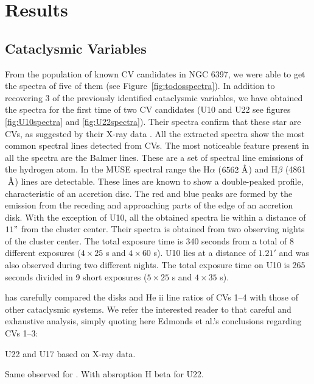 \chapter{Results}\label{chap:results}
\thispagestyle{fancy}

\section{Cataclysmic Variables }
From the population of known CV candidates in NGC 6397, we were able to get the spectra of five of them (see Figure~\ref{fig:todosspectra}). In addition to recovering 3 of the previously identified cataclysmic variables, we have obtained the spectra for the first time of two CV candidates (U10 and U22 see figures \ref{fig:U10spectra} and \ref{fig:U22spectra}).  Their spectra confirm that these star are CVs, as suggested by their X-ray data \citep{grindlay_chandra_2001}. All the extracted spectra show the most common spectral lines detected from CVs. The most noticeable feature present in all the spectra are the Balmer lines. These are a set of spectral line emissions of the hydrogen atom. In the MUSE spectral range the H$\alpha$ ($6562 \text{ \r A}$) and H$\beta$ (4861 $\text{ \r A}$) lines are detectable. These lines are known to show a double-peaked profile, characteristic of an accretion disc. The red and blue peaks are formed by the emission from the receding and approaching parts of the edge of an accretion disk. With the exception of U10, all the obtained spectra lie within a distance of $11"$ from the cluster center. Their spectra is obtained from two observing nights of the cluster center. The total exposure time is 340 seconds from a total of 8 different exposures ($4 \times 25$ s and $4 \times 60$ s). U10 lies at a distance of $1.21'$ and was also observed during two different nights. The total exposure time on U10 is 265 seconds divided in 9 short exposures ($5 \times 25$ s and $4 \times 35$ s).


\cite{edmonds_cataclysmic_1999} has carefully compared the disks and He ii line ratios of CVs 1–4 with those of other cataclysmic systems. We refer the interested reader to that careful and exhaustive analysis, simply quoting here Edmonds et al.’s conclusions regarding
CVs 1–3:

U22 and U17 based on X-ray data. 

Same observed for . With absroption H beta for U22. 



